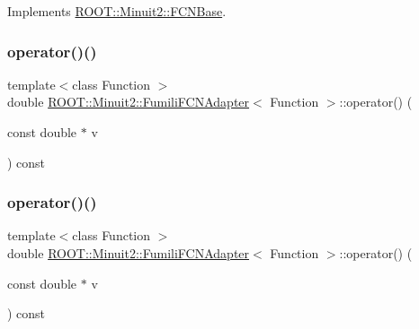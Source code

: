 Implements \mbox{\hyperlink{classROOT_1_1Minuit2_1_1FCNBase_ae4a86bd94d0d0f5ca6fc8f8ab2bb43cd}{R\+O\+O\+T\+::\+Minuit2\+::\+F\+C\+N\+Base}}.

\mbox{\label{classROOT_1_1Minuit2_1_1FumiliFCNAdapter_a0e1a10d68960c681ab3e4d5af5c1018b}} 
\subsubsection{\texorpdfstring{operator()()}{operator()()}\hspace{0.1cm}{\footnotesize\ttfamily [3/4]}}
{\footnotesize\ttfamily template$<$class Function $>$ \\
double \mbox{\hyperlink{classROOT_1_1Minuit2_1_1FumiliFCNAdapter}{R\+O\+O\+T\+::\+Minuit2\+::\+Fumili\+F\+C\+N\+Adapter}}$<$ Function $>$\+::operator() (\begin{DoxyParamCaption}\item[{const double $\ast$}]{v }\end{DoxyParamCaption}) const\hspace{0.3cm}{\ttfamily [inline]}}

\mbox{\label{classROOT_1_1Minuit2_1_1FumiliFCNAdapter_a0e1a10d68960c681ab3e4d5af5c1018b}} 
\subsubsection{\texorpdfstring{operator()()}{operator()()}\hspace{0.1cm}{\footnotesize\ttfamily [4/4]}}
{\footnotesize\ttfamily template$<$class Function $>$ \\
double \mbox{\hyperlink{classROOT_1_1Minuit2_1_1FumiliFCNAdapter}{R\+O\+O\+T\+::\+Minuit2\+::\+Fumili\+F\+C\+N\+Adapter}}$<$ Function $>$\+::operator() (\begin{DoxyParamCaption}\item[{const double $\ast$}]{v }\end{DoxyParamCaption}) const\hspace{0.3cm}{\ttfamily [inline]}}

